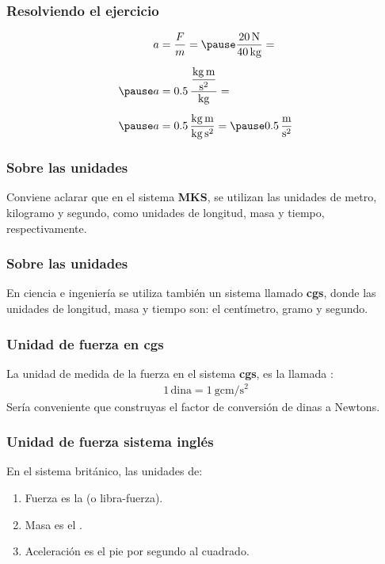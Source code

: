 \documentclass[14pt]{beamer}
\begin{document}
\begin{frame}
\frametitle{Resolviendo el ejercicio}
\pause
\begin{eqnarray*}
\begin{aligned}
a &= \dfrac{F}{m} = \pause \dfrac{\SI{20}{\newton}}{\SI{40}{\kilo\gram}} = \\[0.5em] \pause
a &= 0.5 \, \dfrac{\dfrac{\unit{\kilo\gram\meter}}{\unit{\square\second}}}{\unit{\kilo\gram}} = \\[0.5em] \pause 
a &= 0.5 \, \dfrac{\unit{\kilo\gram\meter}}{\unit{\kilo\gram\square\second}} = \pause \SI[per-mode=fraction]{0.5}{\meter\per\square\second}
\end{aligned}
\end{eqnarray*}
\end{frame}
\begin{frame}
\frametitle{Sobre las unidades}
Conviene aclarar que en el sistema \textbf{MKS}, \pause se utilizan las unidades de metro, kilogramo y segundo, como unidades de longitud, masa y tiempo, respectivamente.
\end{frame}
\begin{frame}
\frametitle{Sobre las unidades}
En ciencia e ingeniería se utiliza también un sistema llamado \textbf{cgs}, \pause donde las unidades de longitud, masa y tiempo son: el centímetro, gramo y segundo.
\end{frame}
\begin{frame}
\frametitle{Unidad de fuerza en cgs}
La unidad de medida de la fuerza en el sistema \textbf{cgs}, es la llamada :
\pause
\begin{align*}
1 \, \text{dina} = \SI[per-mode=fraction]{1}{\gram\centi\meter\per\square\second}
\end{align*}
Sería conveniente que construyas el factor de conversión de dinas a Newtons.
\end{frame}
\begin{frame}
\frametitle{Unidad de fuerza sistema inglés}
En el sistema británico, las unidades de:
\pause
{}
\begin{enumerate}[<+->]
\item Fuerza es la  (o libra-fuerza).
\item Masa es el .
\item Aceleración es el pie por segundo al cuadrado.
\end{enumerate}
\end{frame}
\end{document}
